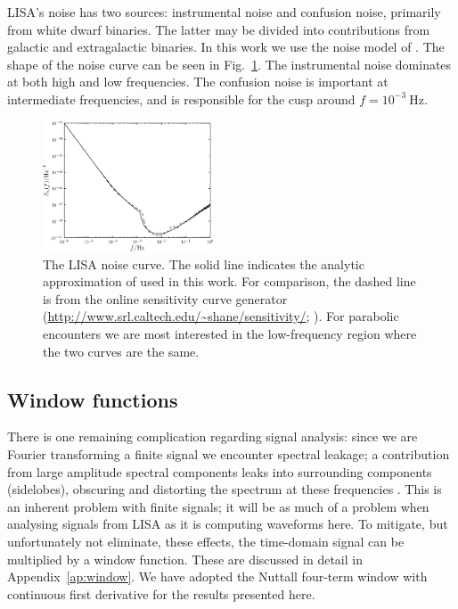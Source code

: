 \documentclass[useAMS,usedcolumn,usegraphicx,usenatbib]{mn2e}
\newcommand{\figref}[1]{Fig.~\ref{fig:#1}}
\newcommand{\apref}[1]{Appendix~\ref{ap:#1}}
\newcommand{\units}[1]{\ensuremath{~\mathrm{#1}}}
\begin{document}
LISA's noise has two sources: instrumental noise and confusion noise, primarily from white dwarf binaries. The latter may be divided into contributions from galactic and extragalactic binaries. In this work we use the noise model of \citet{Barack2004}. The shape of the noise curve can be seen in \figref{Noise}. The instrumental noise dominates at both high and low frequencies. The confusion noise is important at intermediate frequencies, and is responsible for the cusp around $f = 10^{-3}\units{Hz}$.
\begin{figure}
\begin{center}
\includegraphics[width=0.45\textwidth]{Fig_Noise}
\caption{The LISA noise curve. The solid line indicates the analytic approximation of \citet{Barack2004} used in this work. For comparison, the dashed line is from the online sensitivity curve generator (\url{http://www.srl.caltech.edu/~shane/sensitivity/}; \citealt{Larson2000, Larson2002}). For parabolic encounters we are most interested in the low-frequency region where the two curves are the same.}
\label{fig:Noise}
\end{center}
\end{figure}

\subsection{Window functions}

There is one remaining complication regarding signal analysis: since we are Fourier transforming a finite signal we encounter spectral leakage; a contribution from large amplitude spectral components leaks into surrounding components (sidelobes), obscuring and distorting the spectrum at these frequencies \citep{Harris1978}. This is an inherent problem with finite signals; it will be as much of a problem when analysing signals from LISA as it is computing waveforms here. To mitigate, but unfortunately not eliminate, these effects, the time-domain signal can be multiplied by a window function. These are discussed in detail in \apref{window}. We have adopted the Nuttall four-term window with continuous first derivative \citep{Nuttall1981} for the results presented here.
\end{document}
